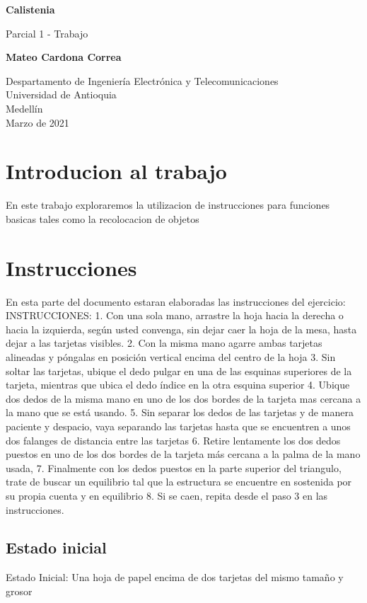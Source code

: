 \documentclass{article}
\begin{document}
\begin{titlepage}
    \begin{center}
        \vspace*{1cm}
            
        \Huge
        \textbf{Calistenia}
            
        \vspace{0.5cm}
        \LARGE
        Parcial 1 - Trabajo
            
        \vspace{1.5cm}
            
        \textbf{Mateo Cardona Correa}
            
        \vfill
            
        \vspace{0.8cm}
            
        \Large
        Despartamento de Ingeniería Electrónica y Telecomunicaciones\\
        Universidad de Antioquia\\
        Medellín\\
        Marzo de 2021
            
    \end{center}
\end{titlepage}

\tableofcontents
\newpage
\section{Introducion al trabajo}\label{intro}
En este trabajo exploraremos la utilizacion de instrucciones para funciones basicas tales como la recolocacion de objetos

\section{Instrucciones} \label{contenido}
En esta parte del documento estaran elaboradas las instrucciones del ejercicio:
INSTRUCCIONES:
1.	Con una sola mano, arrastre la hoja hacia la derecha o hacia la izquierda, según usted convenga, sin dejar caer la hoja de la mesa, hasta dejar a las tarjetas visibles.
2.	Con la misma mano agarre ambas tarjetas alineadas y póngalas en posición vertical encima del centro de la hoja
3.	Sin soltar las tarjetas, ubique el dedo pulgar en una de las esquinas superiores de la tarjeta, mientras que ubica el dedo índice en la otra esquina superior
4.	Ubique dos dedos de la misma mano en uno de los dos bordes de la tarjeta mas cercana a la mano que se está usando.
5.	Sin separar los dedos de las tarjetas y de manera paciente y despacio, vaya separando las tarjetas hasta que se encuentren a unos dos falanges de distancia entre las tarjetas
6.	Retire lentamente los dos dedos puestos en uno de los dos bordes de la tarjeta más cercana a la palma de la mano usada, 
7.	Finalmente con los dedos puestos en la parte superior del triangulo, trate de buscar un equilibrio tal que la estructura se encuentre en sostenida por su propia cuenta y en equilibrio
8.	Si se caen, repita desde el paso 3 en las instrucciones.

\subsection{Estado inicial}
Estado Inicial: Una hoja de papel encima de dos tarjetas del mismo tamaño y grosor
\end{document}
